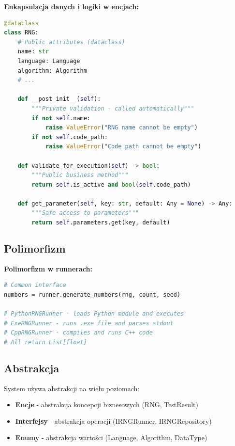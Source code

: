 \documentclass[12pt,a4paper]{article}
\begin{document}
\textbf{Enkapsulacja danych i logiki w encjach:}

\begin{lstlisting}[language=Python, caption=Enkapsulacja w RNG Entity]
@dataclass
class RNG:
    # Public attributes (dataclass)
    name: str
    language: Language
    algorithm: Algorithm
    # ...
    
    def __post_init__(self):
        """Private validation - called automatically"""
        if not self.name:
            raise ValueError("RNG name cannot be empty")
        if not self.code_path:
            raise ValueError("Code path cannot be empty")
    
    def validate_for_execution(self) -> bool:
        """Public business method"""
        return self.is_active and bool(self.code_path)
    
    def get_parameter(self, key: str, default: Any = None) -> Any:
        """Safe access to parameters"""
        return self.parameters.get(key, default)
\end{lstlisting}

\subsection{Polimorfizm}

\textbf{Polimorfizm w runnerach:}

\begin{lstlisting}[language=Python, caption=Rozne implementacje tego samego interfejsu]
# Common interface
numbers = runner.generate_numbers(rng, count, seed)

# PythonRNGRunner - loads Python module and executes
# ExeRNGRunner - runs .exe file and parses stdout
# CppRNGRunner - compiles and runs C++ code
# All return List[float]
\end{lstlisting}

\subsection{Abstrakcja}

System używa abstrakcji na wielu poziomach:

\begin{itemize}
    \item \textbf{Encje} - abstrakcja koncepcji biznesowych (RNG, TestResult)
    \item \textbf{Interfejsy} - abstrakcja operacji (IRNGRunner, IRNGRepository)
    \item \textbf{Enumy} - abstrakcja wartości (Language, Algorithm, DataType)
\end{itemize}
\end{document}

